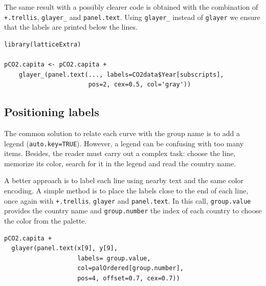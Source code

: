 The same result with a possibly clearer code is obtained with the
combination of \texttt{+.trellis}, \texttt{glayer\_} and \texttt{panel.text}. Using
\texttt{glayer\_} instead of \texttt{glayer} we ensure that the labels are
printed below the lines.


\lstset{language=R}
\begin{lstlisting}
library(latticeExtra)

pCO2.capita <- pCO2.capita +
    glayer_(panel.text(..., labels=CO2data$Year[subscripts],
                       pos=2, cex=0.5, col='gray'))
\end{lstlisting}
\subsection{Positioning labels}
\label{sec-1-3}


The common solution to relate each curve with the group name is to
add a legend (\texttt{auto.key=TRUE}). However, a legend can be confusing
with too many items. Besides, the reader must carry out a complex
task: choose the line, memorize its color, search for it in the
legend and read the country name.

A better approach is to label each line using nearby text and the
same color encoding. A simple method is to place the labels close
to the end of each line, once again with \texttt{+.trellis}, \texttt{glayer} and
\texttt{panel.text}. In this call, \texttt{group.value} provides the country
name and \texttt{group.number} the index of each country to choose the
color from the palette.


\lstset{language=R}
\begin{lstlisting}
pCO2.capita +
  glayer(panel.text(x[9], y[9],
                    labels= group.value,
                    col=palOrdered[group.number],
                    pos=4, offset=0.7, cex=0.7))
\end{lstlisting}

